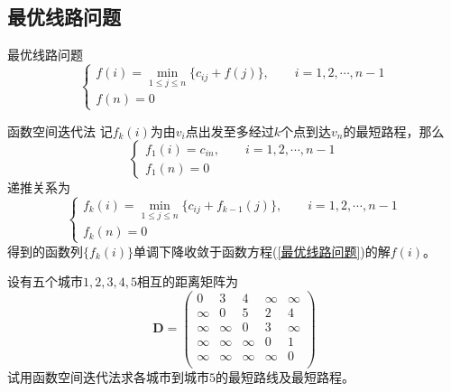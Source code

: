 \documentclass[lang = cn, scheme = chinese, thmcnt = section]{elegantbook}
\begin{document}
\subsection{最优线路问题}

\begin{definition}{最优线路问题}
	\begin{equation}\label{最优线路问题}
		\begin{cases}
			f(i)=\min\limits_{1\le j \le n}\{ c_{ij}+f(j) \},\qquad i=1,2,\cdots,n-1\\
			f(n)=0
		\end{cases}\tag{*}
	\end{equation}
\end{definition}

\begin{theorem}{函数空间迭代法}
	记$f_k(i)$为由$v_i$点出发至多经过$k$个点到达$v_n$的最短路程，那么%
	$$
	\begin{cases}
		f_1(i)=c_{in},\qquad i=1,2,\cdots,n-1\\
		f_1(n)=0
	\end{cases}
	$$
	递推关系为%
	$$
	\begin{cases}
		f_k(i)=\min\limits_{1\le j \le n}\{ c_{ij}+f_{k-1}(j) \},\qquad i=1,2,\cdots,n-1\\
		f_k(n)=0
	\end{cases}
	$$
	得到的函数列$\{ f_k(i) \}$单调下降收敛于函数方程(\ref{最优线路问题})的解$f(i)$。
\end{theorem}

\begin{example}
	设有五个城市$1,2,3,4,5$相互的距离矩阵为
	$$
	\boldsymbol{D}=\begin{pmatrix}
		0 & 3 & 4 & \infty & \infty \\
		\infty & 0 & 5 & 2 & 4 \\
		\infty & \infty & 0 & 3 & \infty \\
		\infty & \infty & \infty & 0 & 1 \\
		\infty & \infty & \infty & \infty & 0 \\
	\end{pmatrix}
	$$
	试用函数空间迭代法求各城市到城市$5$的最短路线及最短路程。
\end{example}
\end{document}
